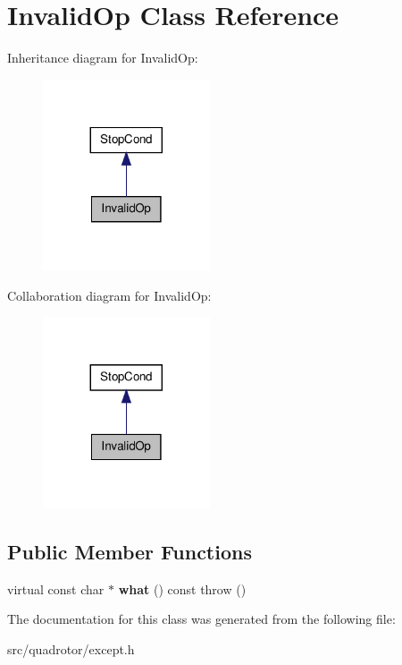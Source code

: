 \hypertarget{classInvalidOp}{\section{\-Invalid\-Op \-Class \-Reference}
\label{classInvalidOp}
}


\-Inheritance diagram for \-Invalid\-Op\-:\nopagebreak
\begin{figure}[H]
\begin{center}
\leavevmode
\includegraphics[width=140pt]{classInvalidOp__inherit__graph}
\end{center}
\end{figure}


\-Collaboration diagram for \-Invalid\-Op\-:\nopagebreak
\begin{figure}[H]
\begin{center}
\leavevmode
\includegraphics[width=140pt]{classInvalidOp__coll__graph}
\end{center}
\end{figure}
\subsection*{\-Public \-Member \-Functions}
\begin{DoxyCompactItemize}
\item 
\hypertarget{classInvalidOp_ad89cda4b62702beb435e982f0c8b9e42}{virtual const char $\ast$ {\bfseries what} () const   throw ()}\label{classInvalidOp_ad89cda4b62702beb435e982f0c8b9e42}

\end{DoxyCompactItemize}


\-The documentation for this class was generated from the following file\-:\begin{DoxyCompactItemize}
\item 
src/quadrotor/except.\-h\end{DoxyCompactItemize}
